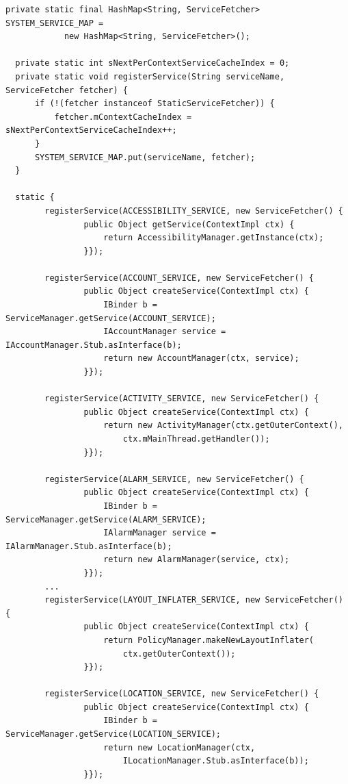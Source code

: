 \begin{lstlisting}[frame=single, caption=ContextImpl.java] 
  private static final HashMap<String, ServiceFetcher> SYSTEM_SERVICE_MAP =
            new HashMap<String, ServiceFetcher>();

  private static int sNextPerContextServiceCacheIndex = 0;
  private static void registerService(String serviceName, ServiceFetcher fetcher) {
      if (!(fetcher instanceof StaticServiceFetcher)) {
          fetcher.mContextCacheIndex = sNextPerContextServiceCacheIndex++;
      }
      SYSTEM_SERVICE_MAP.put(serviceName, fetcher);
  }
    
  static {
        registerService(ACCESSIBILITY_SERVICE, new ServiceFetcher() {
                public Object getService(ContextImpl ctx) {
                    return AccessibilityManager.getInstance(ctx);
                }});

        registerService(ACCOUNT_SERVICE, new ServiceFetcher() {
                public Object createService(ContextImpl ctx) {
                    IBinder b = ServiceManager.getService(ACCOUNT_SERVICE);
                    IAccountManager service = IAccountManager.Stub.asInterface(b);
                    return new AccountManager(ctx, service);
                }});

        registerService(ACTIVITY_SERVICE, new ServiceFetcher() {
                public Object createService(ContextImpl ctx) {
                    return new ActivityManager(ctx.getOuterContext(), 
                    	ctx.mMainThread.getHandler());
                }});

        registerService(ALARM_SERVICE, new ServiceFetcher() {
                public Object createService(ContextImpl ctx) {
                    IBinder b = ServiceManager.getService(ALARM_SERVICE);
                    IAlarmManager service = IAlarmManager.Stub.asInterface(b);
                    return new AlarmManager(service, ctx);
                }});
		...
        registerService(LAYOUT_INFLATER_SERVICE, new ServiceFetcher() {
                public Object createService(ContextImpl ctx) {
                    return PolicyManager.makeNewLayoutInflater(
                    	ctx.getOuterContext());
                }});

        registerService(LOCATION_SERVICE, new ServiceFetcher() {
                public Object createService(ContextImpl ctx) {
                    IBinder b = ServiceManager.getService(LOCATION_SERVICE);
                    return new LocationManager(ctx, 
                    	ILocationManager.Stub.asInterface(b));
                }});


\end{lstlisting}
